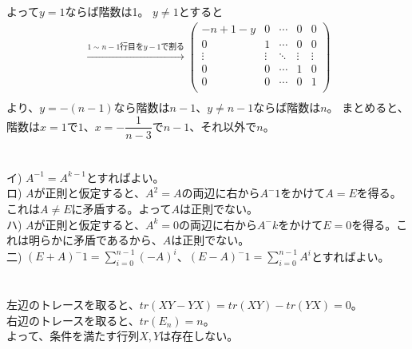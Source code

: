 \documentclass{jsarticle}
\begin{document}
よって$y = 1$ならば階数は1。
$y \neq 1$とすると
\begin{eqnarray*}
	\xrightarrow{1{\sim}n-1行目をy-1で割る}
	\left(
		\begin{array}{ccccc}
			-n + 1 - y & 0 & \cdots & 0 & 0\\
			 0 & 1 & \cdots & 0 & 0\\
			 \vdots & \vdots & \ddots & \vdots & \vdots\\
			 0 & 0 & \cdots & 1 & 0\\
			 0 & 0 & \cdots & 0 & 1\\
		\end{array}
	\right)\\
\end{eqnarray*}
より、$y=-(n-1)$なら階数は$n-1$、$y\neq n-1$ならば階数は$n$。
まとめると、階数は$x = 1$で$1$、$x = -\dfrac{1}{n-3}$で$n-1$、それ以外で$n$。\\

\section{} %
\section{} %
イ) $A^{-1} = A^{k-1}$とすればよい。\\
ロ) $A$が正則と仮定すると、$A^2 = A$の両辺に右から$A^-1$をかけて$A=E$を得る。これは$A \neq E$に矛盾する。よって$A$は正則でない。\\
ハ) $A$が正則と仮定すると、$A^k = 0$の両辺に右から$A^-k$をかけて$E=0$を得る。これは明らかに矛盾であるから、$A$は正則でない。\\
二) $(E + A)^-1 = \sum_{i=0}^{n-1} (-A)^i$、$(E - A)^-1 = \sum_{i=0}^{n-1} A^i$とすればよい。\\

\section{} %
左辺のトレースを取ると、$tr(XY - YX) = tr(XY) - tr(YX) = 0$。\\
右辺のトレースを取ると、$tr(E_n) = n$。\\
よって、条件を満たす行列$X, Y$は存在しない。\\

\section{} %
\end{document}
